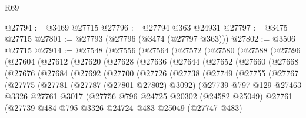 \begin{lexlean}{R69}
\begin{coremodule}
@27794 := @3469 @27715
@27796 := @27794 @363 @24931
@27797 := @3475 @27715
@27801 := @27793 (@27796 (@3474 (@27797 @363)))
@27802 := @3506 @27715
@27914 := @27548
    (@27556
      (@27564
        (@27572
          (@27580
            (@27588
              (@27596
                (@27604
                  (@27612
                    (@27620
                      (@27628
                        (@27636
                          (@27644
                            (@27652
                              (@27660
                                (@27668
                                  (@27676
                                    (@27684
                                      (@27692
                                        (@27700
                                          (@27726
                                            (@27738
                                              (@27749
                                                (@27755
                                                  (@27767
                                                    (@27775
                                                      (@27781
                                                        (@27787 (@27801 @27802) @3092)
                                                        (@27739
                                                          @797
                                                          @129
                                                          @27463
                                                          @3326
                                                          @27761
                                                          @3017
                                                          (@27756
                                                            @796
                                                            @24725
                                                            @20302
                                                            (@24582 @25049)
                                                            @27761
                                                            (@27739
                                                              @484
                                                              @795
                                                              @3326
                                                              @24724
                                                              @483
                                                              @25049
                                                              (@27747 @483)

\end{coremodule}
\end{lexlean}
